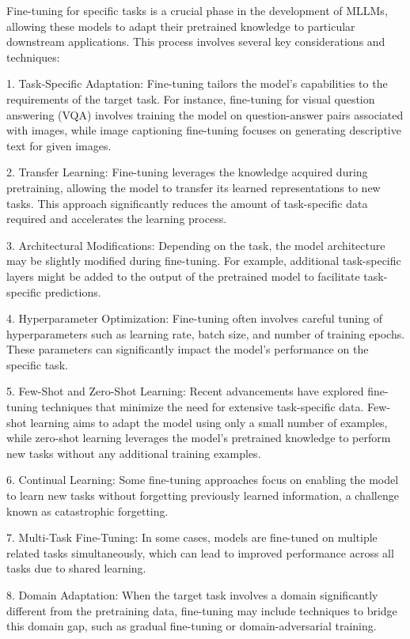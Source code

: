 Fine-tuning for specific tasks is a crucial phase in the development of MLLMs, allowing these models to adapt their pretrained knowledge to particular downstream applications. This process involves several key considerations and techniques:

1. Task-Specific Adaptation: Fine-tuning tailors the model's capabilities to the requirements of the target task. For instance, fine-tuning for visual question answering (VQA) involves training the model on question-answer pairs associated with images, while image captioning fine-tuning focuses on generating descriptive text for given images.

2. Transfer Learning: Fine-tuning leverages the knowledge acquired during pretraining, allowing the model to transfer its learned representations to new tasks. This approach significantly reduces the amount of task-specific data required and accelerates the learning process.

3. Architectural Modifications: Depending on the task, the model architecture may be slightly modified during fine-tuning. For example, additional task-specific layers might be added to the output of the pretrained model to facilitate task-specific predictions.

4. Hyperparameter Optimization: Fine-tuning often involves careful tuning of hyperparameters such as learning rate, batch size, and number of training epochs. These parameters can significantly impact the model's performance on the specific task.

5. Few-Shot and Zero-Shot Learning: Recent advancements have explored fine-tuning techniques that minimize the need for extensive task-specific data. Few-shot learning aims to adapt the model using only a small number of examples, while zero-shot learning leverages the model's pretrained knowledge to perform new tasks without any additional training examples.

6. Continual Learning: Some fine-tuning approaches focus on enabling the model to learn new tasks without forgetting previously learned information, a challenge known as catastrophic forgetting.

7. Multi-Task Fine-Tuning: In some cases, models are fine-tuned on multiple related tasks simultaneously, which can lead to improved performance across all tasks due to shared learning.

8. Domain Adaptation: When the target task involves a domain significantly different from the pretraining data, fine-tuning may include techniques to bridge this domain gap, such as gradual fine-tuning or domain-adversarial training.

